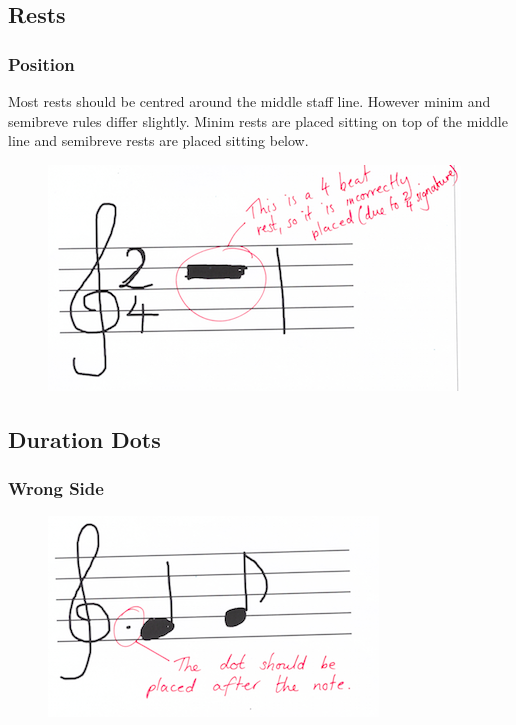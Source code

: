 \subsection{Rests}

\subsubsection{Position}\label{sec:tf-rest-position}
Most rests should be centred around the middle staff line. However minim and semibreve rules differ slightly. Minim rests are placed sitting on top of the middle line and semibreve rests are placed sitting below.

\begin{figure}[H]
  \centering
  \includegraphics[width=.6\linewidth]{gfx/teacher-notes/mistake-rest-position.png}
  \caption{}
\end{figure}

\subsection{Duration Dots}

\subsubsection{Wrong Side}\label{sec:tf-dot-wrong-side}

\begin{figure}[H]
  \centering
  \includegraphics[width=.6\linewidth]{gfx/teacher-notes/mistake-dot-wrong-side.png}
  \caption{}
\end{figure}

